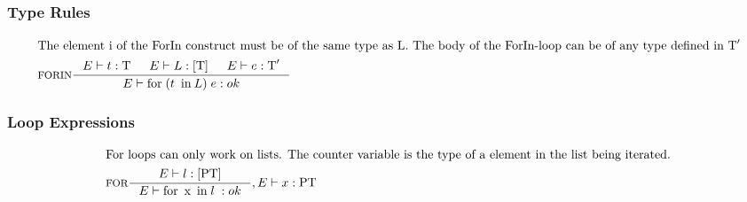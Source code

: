 \subsubsection{Type Rules}

\begin{align*}
\intertext{The element i of the ForIn construct must be of the same type as L. The body of the ForIn-loop can be of any type defined in $\Tt'$}
&\inference[FORIN]{\Tenv t : \Tt &
                   \Tenv L : [\Tt] &
                  \Tenv e : \Tt'}
                 {\Tenv \mathbin{\text{for}} \; (t \; \mathbin{\text{in}} L) \; {e}: ok}
\end{align*}

\subsubsection{Loop Expressions}
\begin{align*}
\intertext{For loops can only work on lists. The counter variable is the type of a element in the list being iterated.}
&\inference[FOR]{\Tenv l : [\Tpt]}
                 {\Tenv \mathbin{\text{for}} \; \mathbin{\text{x}} \; \mathbin{\text{in}} \; {l} \; : ok },	 \Tenv x : \Tpt
\end{align*}
